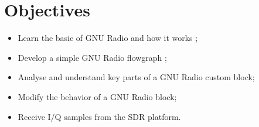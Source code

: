 \section*{Objectives}

\begin{itemize}
    \item Learn the basic of GNU Radio and how it works ;
    \item Develop a simple GNU Radio flowgraph ;
    \item Analyse and understand key parts of a GNU Radio custom block;
    \item Modify the behavior of a GNU Radio block;
    \item Receive I/Q samples from the SDR platform.
\end{itemize}
